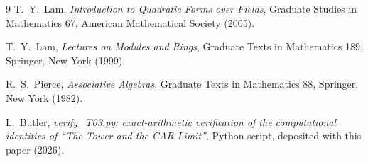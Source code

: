 \documentclass[11pt]{article}
\theoremstyle{definition}
\begin{document}
\begin{thebibliography}{9}
T.~Y.~Lam,
\emph{Introduction to Quadratic Forms over Fields},
Graduate Studies in Mathematics 67, American Mathematical Society (2005).

T.~Y.~Lam,
\emph{Lectures on Modules and Rings},
Graduate Texts in Mathematics 189, Springer, New York (1999).

R.~S.~Pierce,
\emph{Associative Algebras},
Graduate Texts in Mathematics 88, Springer, New York (1982).

L.~Butler,
\emph{verify\_T03.py: exact-arithmetic verification of the computational identities of ``The Tower and the CAR Limit''},
Python script, deposited with this paper (2026).

\end{thebibliography}
\end{document}
